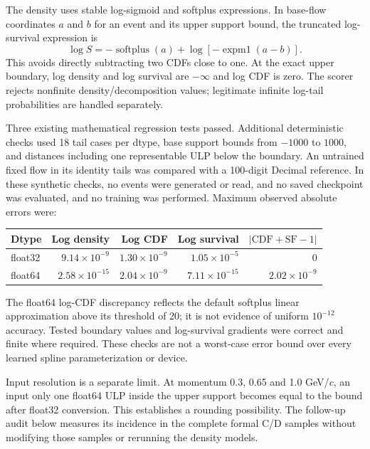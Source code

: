 \documentclass[11pt]{article}
\begin{document}
The density uses stable log-sigmoid and softplus expressions. In base-flow
coordinates $a$ and $b$ for an event and its upper support bound, the truncated
log-survival expression is
\begin{equation}
 \log S=-\operatorname{softplus}(a)+\log[-\operatorname{expm1}(a-b)].
\end{equation}
This avoids directly subtracting two CDFs close to one. At the exact upper
boundary, log density and log survival are $-\infty$ and log CDF is zero.
The scorer rejects nonfinite density/decomposition values; legitimate
infinite log-tail probabilities are handled separately.

Three existing mathematical regression tests passed. Additional deterministic
checks used 18 tail cases per dtype, base support bounds from $-1000$ to
$1000$, and distances including one representable ULP below the boundary.
An untrained fixed flow in its identity tails was compared with a 100-digit
Decimal reference. In these synthetic checks, no events were generated or read, and no saved checkpoint was
evaluated, and no training was performed. Maximum observed absolute errors
were:
\begin{center}
\begin{tabular}{lrrrr}
\toprule
Dtype & Log density & Log CDF & Log survival & $|\mathrm{CDF}+\mathrm{SF}-1|$\\
\midrule
float32 & $9.14\times10^{-9}$ & $1.30\times10^{-9}$ & $1.05\times10^{-5}$ & $0$\\
float64 & $2.58\times10^{-15}$ & $2.04\times10^{-9}$ & $7.11\times10^{-15}$ & $2.02\times10^{-9}$\\
\bottomrule
\end{tabular}
\end{center}
The float64 log-CDF discrepancy reflects the default softplus linear
approximation above its threshold of 20; it is not evidence of uniform
$10^{-12}$ accuracy. Tested boundary values and log-survival gradients were
correct and finite where required. These checks are not a worst-case error
bound over every learned spline parameterization or device.

Input resolution is a separate limit. At momentum 0.3, 0.65 and 1.0 GeV/$c$,
an input only one float64 ULP inside the upper support becomes equal to the
bound after float32 conversion. This establishes a rounding possibility.
The follow-up audit below measures its incidence in the complete formal C/D
samples without modifying those samples or rerunning the density models.
\end{document}
